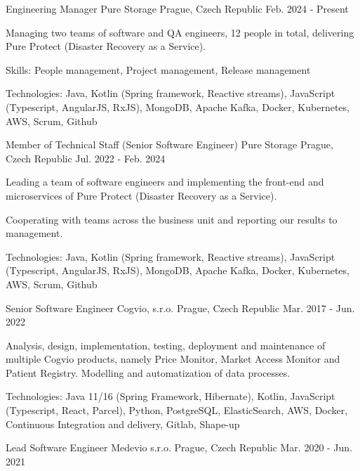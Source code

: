 \begin{cventries}
  \cventry
    {Engineering Manager}
    {Pure Storage}
    {Prague, Czech Republic}
    {Feb. 2024 - Present}
    {
    \begin{cvitems}
      \item {Managing two teams of software and QA engineers, 12 people in total, delivering Pure Protect (Disaster Recovery as a Service).}
      \item {Skills: People management, Project management, Release management}
      \item {Technologies: Java, Kotlin (Spring framework, Reactive streams), JavaScript (Typescript, AngularJS, RxJS), MongoDB, Apache Kafka, Docker, Kubernetes, AWS, Scrum, Github}
    \end{cvitems}
    }
  \cventry
    {Member of Technical Staff (Senior Software Engineer)}
    {Pure Storage}
    {Prague, Czech Republic}
    {Jul. 2022 - Feb. 2024}
    {
    \begin{cvitems}
      \item {Leading a team of software engineers and implementing the front-end and microservices of Pure Protect (Disaster Recovery as a Service).}
      \item {Cooperating with teams across the business unit and reporting our results to management.}
      \item {Technologies: Java, Kotlin (Spring framework, Reactive streams), JavaScript (Typescript, AngularJS, RxJS), MongoDB, Apache Kafka, Docker, Kubernetes, AWS, Scrum, Github}
    \end{cvitems}
  }
  \cventry
    {Senior Software Engineer}
    {Cogvio, s.r.o.}
    {Prague, Czech Republic}
    {Mar. 2017 - Jun. 2022}
    {
    \begin{cvitems}
      \item {Analysis, design, implementation, testing, deployment and maintenance of multiple Cogvio products, namely Price Monitor, Market Access Monitor and Patient Registry. Modelling and automatization of data processes.}
      \item {Technologies: Java 11/16 (Spring Framework, Hibernate), Kotlin, JavaScript (Typescript, React, Parcel), Python, PostgreSQL, ElasticSearch, AWS, Docker, Continuous Integration and delivery, Gitlab, Shape-up}
    \end{cvitems}
  }
  \cventry
    {Lead Software Engineer}
    {Medevio s.r.o.}
    {Prague, Czech Republic}
    {Mar. 2020 - Jun. 2021}
    {
    \begin{cvitems}

\end{cvitems}}
\end{cventries}
